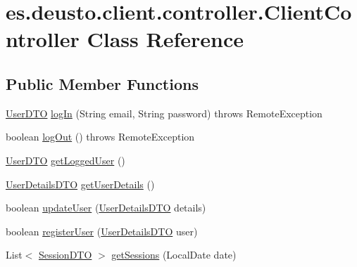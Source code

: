\hypertarget{classes_1_1deusto_1_1client_1_1controller_1_1_client_controller}{}\section{es.\+deusto.\+client.\+controller.\+Client\+Controller Class Reference}
\label{classes_1_1deusto_1_1client_1_1controller_1_1_client_controller}
\subsection*{Public Member Functions}
\begin{DoxyCompactItemize}
\item 
\mbox{\hyperlink{classes_1_1deusto_1_1server_1_1data_1_1_user_d_t_o}{User\+D\+TO}} \mbox{\hyperlink{classes_1_1deusto_1_1client_1_1controller_1_1_client_controller_a075c2e627be920454324dacbbc72295c}{log\+In}} (String email, String password)  throws Remote\+Exception 
\item 
boolean \mbox{\hyperlink{classes_1_1deusto_1_1client_1_1controller_1_1_client_controller_a9379da9c24d71d3ebafaa44e0f858340}{log\+Out}} ()  throws Remote\+Exception 
\item 
\mbox{\hyperlink{classes_1_1deusto_1_1server_1_1data_1_1_user_d_t_o}{User\+D\+TO}} \mbox{\hyperlink{classes_1_1deusto_1_1client_1_1controller_1_1_client_controller_ac9d06db0017e2f06d06e8669398118f4}{get\+Logged\+User}} ()
\item 
\mbox{\hyperlink{classes_1_1deusto_1_1server_1_1data_1_1_user_details_d_t_o}{User\+Details\+D\+TO}} \mbox{\hyperlink{classes_1_1deusto_1_1client_1_1controller_1_1_client_controller_ac1bd9affe27668ee49320daae38d67a0}{get\+User\+Details}} ()
\item 
boolean \mbox{\hyperlink{classes_1_1deusto_1_1client_1_1controller_1_1_client_controller_ad1a2384c7c7f73d40d8d50c4bf77be7d}{update\+User}} (\mbox{\hyperlink{classes_1_1deusto_1_1server_1_1data_1_1_user_details_d_t_o}{User\+Details\+D\+TO}} details)
\item 
boolean \mbox{\hyperlink{classes_1_1deusto_1_1client_1_1controller_1_1_client_controller_a8f77e4957f536e48d7012d643d2c6cb8}{register\+User}} (\mbox{\hyperlink{classes_1_1deusto_1_1server_1_1data_1_1_user_details_d_t_o}{User\+Details\+D\+TO}} user)
\item 
List$<$ \mbox{\hyperlink{classes_1_1deusto_1_1server_1_1data_1_1_session_d_t_o}{Session\+D\+TO}} $>$ \mbox{\hyperlink{classes_1_1deusto_1_1client_1_1controller_1_1_client_controller_a06a84e0834fb21c31f4988e26ee6dedf}{get\+Sessions}} (Local\+Date date)

\end{DoxyCompactItemize}
